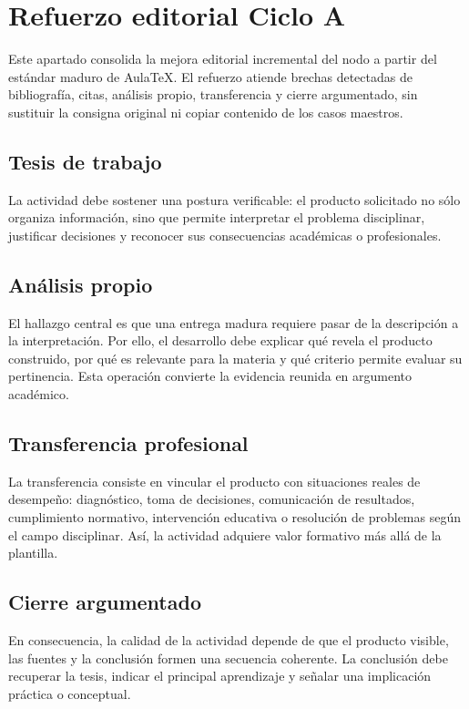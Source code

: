 \documentclass[12pt,letterpaper,oneside]{article}
\begin{document}
\section*{Refuerzo editorial Ciclo A}
Este apartado consolida la mejora editorial incremental del nodo a partir del estándar maduro de AulaTeX. El refuerzo atiende brechas detectadas de bibliografía, citas, análisis propio, transferencia y cierre argumentado, sin sustituir la consigna original ni copiar contenido de los casos maestros.

\subsection*{Tesis de trabajo}
La actividad debe sostener una postura verificable: el producto solicitado no sólo organiza información, sino que permite interpretar el problema disciplinar, justificar decisiones y reconocer sus consecuencias académicas o profesionales.

\subsection*{Análisis propio}
El hallazgo central es que una entrega madura requiere pasar de la descripción a la interpretación. Por ello, el desarrollo debe explicar qué revela el producto construido, por qué es relevante para la materia y qué criterio permite evaluar su pertinencia. Esta operación convierte la evidencia reunida en argumento académico.

\subsection*{Transferencia profesional}
La transferencia consiste en vincular el producto con situaciones reales de desempeño: diagnóstico, toma de decisiones, comunicación de resultados, cumplimiento normativo, intervención educativa o resolución de problemas según el campo disciplinar. Así, la actividad adquiere valor formativo más allá de la plantilla.

\subsection*{Cierre argumentado}
En consecuencia, la calidad de la actividad depende de que el producto visible, las fuentes y la conclusión formen una secuencia coherente. La conclusión debe recuperar la tesis, indicar el principal aprendizaje y señalar una implicación práctica o conceptual.
\end{document}
